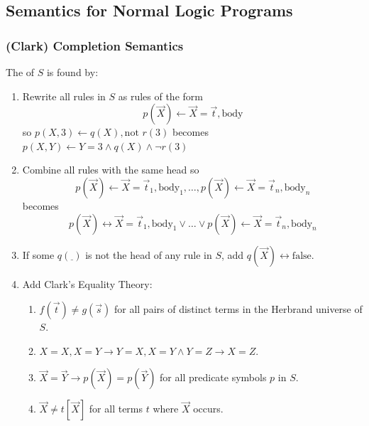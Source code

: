 \documentclass[twocolumn,english]{article}
\let\emph\relax
\begin{document}
\subsection{Semantics for Normal Logic Programs}

\subsubsection{(Clark) Completion Semantics}

The \emph{completion} of $S$ is found by: 
\begin{enumerate}
\item Rewrite all rules in $S$ as rules of the form 
\[
p\left(\overrightarrow{X}\right)\leftarrow\overrightarrow{X}=\overrightarrow{t},\text{body}
\]
so $p\left(X,3\right)\leftarrow q\left(X\right),\text{not }r\left(3\right)$
becomes $p\left(X,Y\right)\leftarrow Y=3\land q\left(X\right)\land\lnot r\left(3\right)$ 
\item Combine all rules with the same head so 
\[
p\left(\overrightarrow{X}\right)\leftarrow\overrightarrow{X}=\overrightarrow{t}_{1},\text{body}_{1},\dots,p\left(\overrightarrow{X}\right)\leftarrow\overrightarrow{X}=\overrightarrow{t}_{n},\text{body}_{n}
\]
becomes 
\[
p\left(\overrightarrow{X}\right)\leftrightarrow\overrightarrow{X}=\overrightarrow{t}_{1},\text{body}_{1}\lor\dots\lor p\left(\overrightarrow{X}\right)\leftarrow\overrightarrow{X}=\overrightarrow{t}_{n},\text{body}_{n}
\]
\item If some $q\left(\underline{\;}\right)$ is not the head of any rule
in $S$, add $q\left(\overrightarrow{X}\right)\leftrightarrow\text{false}$. 
\item Add Clark's Equality Theory: 
\begin{enumerate}
\item $f\left(\overrightarrow{t}\right)\neq g\left(\overrightarrow{s}\right)$
for all pairs of distinct terms in the Herbrand universe of $S$. 
\item $X=X,X=Y\rightarrow Y=X,X=Y\land Y=Z\rightarrow X=Z$. 
\item $\overrightarrow{X}=\overrightarrow{Y}\rightarrow p\left(\overrightarrow{X}\right)=p\left(\overrightarrow{Y}\right)$
for all predicate symbols $p$ in $S$. 
\item $\overrightarrow{X}\neq t\left[\overrightarrow{X}\right]$ for all
terms $t$ where $\overrightarrow{X}$ occurs. 
\end{enumerate}
\end{enumerate}
\end{document}
